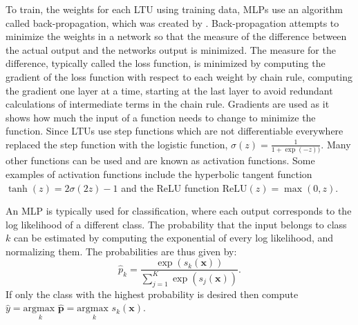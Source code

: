\documentclass[\main/thesis.tex]{subfiles}
\begin{document}
To train, the weights for each LTU using training data, MLPs use an algorithm called back-propagation, which was created by \textcite{Rumelhart}. Back-propagation attempts to minimize the weights in a network so that the measure of the difference between the actual output and the networks output is minimized. The measure for the difference, typically called the loss function, is minimized by computing the gradient of the loss function with respect to each weight by chain rule, computing the gradient one layer at a time, starting at the last layer to avoid redundant calculations of intermediate terms in the chain rule. Gradients are used as it shows how much the input of a function needs to change to minimize the function. Since LTUs use step functions which are not differentiable everywhere \textcite{Rumelhart} replaced the step function with the logistic function, $\sigma(z) {=} \frac{1}{1 {+} \exp({-}z))}$. Many other functions can be used and are known as activation functions. Some examples of activation functions include the hyperbolic tangent function $\tanh(z) {=} 2\sigma(2z) {-} 1$ and the ReLU function $\text{ReLU}(z) {=} \max(0, z)$. 

An MLP is typically used for classification, where each output corresponds to the log likelihood of a different class. The probability that the input belongs to class $k$ can be estimated by computing the exponential of every log likelihood, and normalizing them. The probabilities are thus given by:
$$\hat{p}_k {=} \frac{\exp(s_k(\boldsymbol{x}))}{\sum_{j{=}1}^K \exp(s_j(\boldsymbol{x}))}.$$
If only the class with the highest probability is desired then compute 
$\hat{y} = \underset{k}{\text{argmax }} \boldsymbol{\hat{p}} = \underset{k}{\text{argmax }} s_k(\boldsymbol{x})$.
\end{document}
